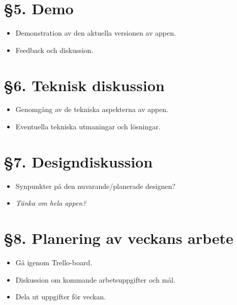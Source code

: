 \documentclass[a4paper, 11pt]{article}
\begin{document}
\section*{§5. Demo}

\begin{itemize}
    \item Demonstration av den aktuella versionen av appen.\\
    \item Feedback och diskussion.\\
\end{itemize}

\section*{§6. Teknisk diskussion }

\begin{itemize}
    \item Genomgång av de tekniska aspekterna av appen.\\
    
    \item Eventuella tekniska utmaningar och lösningar.\\
    
\end{itemize}

\section*{§7. Designdiskussion}

\begin{itemize}
    \item Synpunkter på den nuvarande/planerade designen? \\
    \item \textit{Tänka om hela appen?}\\
    
    
\end{itemize}

\section*{§8. Planering av veckans arbete}
\begin{itemize}
    \item Gå igenom Trello-board.\\
    \item Diskussion om kommande arbetsuppgifter och mål.\\
    \item Dela ut uppgifter för veckan.\\
\end{itemize}
\end{document}
